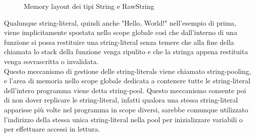 \begin{figure}[htbp]
    \centering
    \caption{Memory layout dei tipi String e RawString}
    \label{fig:string_mem_layout}
\end{figure}
\newpage


Qualunque string-literal, quindi anche "Hello, World!" nell’esempio di prima, viene implicitamente spostata 
nello scope globale così che dall’interno di una funzione si possa restituire una string-literal senza temere 
che alla fine della chiamata lo stack della funzione venga ripulito e che la stringa appena restituita venga 
sovrascritta o invalidata. \\

Questo meccanismo di gestione delle string-literals viene chiamato string-pooling, e l’area di memoria 
nello scope globale dedicata a contenere tutte le string-literal dell’intero programma viene detta string-pool. Questo 
meccanismo consente poi di non dover replicare le string-literal, infatti qualora una stessa string-literal apparisse 
più volte nel programma in scope diversi, sarebbe comunque utilizzato l’indirizzo della stessa unica string-literal 
nella pool per inizializzare variabili o per effettuare accessi in lettura. \\

